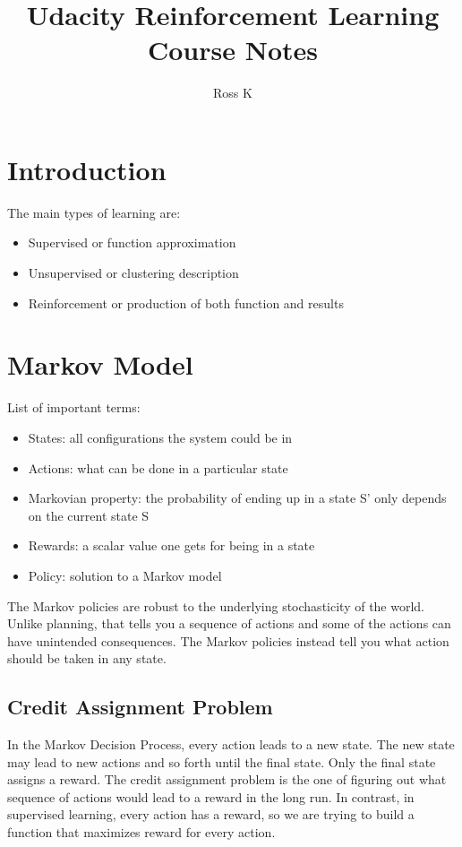 \documentclass{article}
\title{Udacity Reinforcement Learning Course Notes}
\author{Ross K}
\begin{document}
\maketitle
\tableofcontents
\newpage
{}

\section{Introduction}
The main types of learning are:
  \begin{itemize}
    \item Supervised or function approximation
    \item Unsupervised or clustering description
    \item Reinforcement or production of both function and results
  \end{itemize}
\section{Markov Model}
List of important terms:
  \begin{itemize}
    \item States: all configurations the system could be in
    \item Actions: what can be done in a particular state
    \item Markovian property: the probability of ending up in a state S’ only depends on the current state S
    \item Rewards: a scalar value one gets for being in a state
    \item Policy: solution to a Markov model
  \end{itemize}
The Markov policies are robust to the underlying stochasticity of the world. Unlike planning, that tells you a sequence of actions and some of the actions can have unintended consequences. The Markov policies instead tell you what action should be taken in any state.
\subsection{Credit Assignment Problem}
In the Markov Decision Process, every action leads to a new state. The new state may lead to new actions and so forth until the final state. Only the final state assigns a reward. The credit assignment problem is the one of figuring out what sequence of actions would lead to a reward in the long run. In contrast, in supervised learning, every action has a reward, so we are trying to build a function that maximizes reward for every action.
\end{document}
